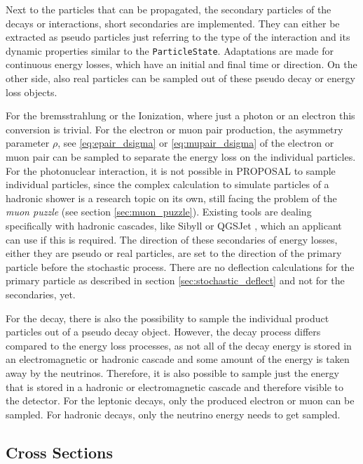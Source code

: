 Next to the particles that can be propagated, the secondary particles of the decays or interactions, short secondaries are implemented.
They can either be extracted as pseudo particles just referring to the type of the interaction and its dynamic properties similar to the \texttt{ParticleState}.
Adaptations are made for continuous energy losses, which have an initial and final time or direction.
On the other side, also real particles can be sampled out of these pseudo decay or energy loss objects.

For the bremsstrahlung or the Ionization, where just a photon or an electron this conversion is trivial.
For the electron or muon pair production, the asymmetry parameter $\rho$, see \eqref{eq:epair_dsigma} or \eqref{eq:mupair_dsigma} of the electron or muon pair can be sampled to separate the energy loss on the individual particles.
For the photonuclear interaction, it is not possible in PROPOSAL to sample individual particles, since the complex calculation to simulate particles of a hadronic shower is a research topic on its own, still facing the problem of the \textit{muon puzzle} (see section \ref{sec:muon_puzzle}).
Existing tools are dealing specifically with hadronic cascades, like Sibyll \cite{Riehn20Sibyll} or QGSJet \cite{Ostapchenko10qgsjet}, which an applicant can use if this is required.
The direction of these secondaries of energy losses, either they are pseudo or real particles, are set to the direction of the primary particle before the stochastic process.
There are no deflection calculations for the primary particle as described in section \ref{sec:stochastic_deflect} and not for the secondaries, yet.

For the decay, there is also the possibility to sample the individual product particles out of a pseudo decay object.
However, the decay process differs compared to the energy loss processes, as not all of the decay energy is stored in an electromagnetic or hadronic cascade and some amount of the energy is taken away by the neutrinos.
Therefore, it is also possible to sample just the energy that is stored in a hadronic or electromagnetic cascade and therefore visible to the detector.
For the leptonic decays, only the produced electron or muon can be sampled.
For hadronic decays, only the neutrino energy needs to get sampled.

%

\subsection{Cross Sections}

